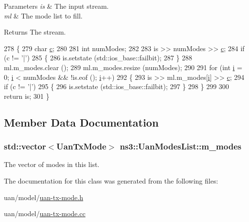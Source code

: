 \begin{DoxyParams}{Parameters}
{\em is} & The input stream. \\
\hline
{\em ml} & The mode list to fill. \\
\hline
\end{DoxyParams}
\begin{DoxyReturn}{Returns}
The stream. 
\end{DoxyReturn}

\begin{DoxyCode}
278 \{
279   \textcolor{keywordtype}{char} \hyperlink{lte_2model_2fading-traces_2fading__trace__generator_8m_ae0323a9039add2978bf5b49550572c7c}{c};
280 
281   \textcolor{keywordtype}{int} numModes;
282 
283   is >> numModes >> \hyperlink{lte_2model_2fading-traces_2fading__trace__generator_8m_ae0323a9039add2978bf5b49550572c7c}{c};
284   \textcolor{keywordflow}{if} (c != \textcolor{charliteral}{'|'})
285     \{
286       is.setstate (std::ios\_base::failbit);
287     \}
288   ml.m\_modes.clear ();
289   ml.m\_modes.resize (numModes);
290 
291   \textcolor{keywordflow}{for} (\textcolor{keywordtype}{int} \hyperlink{bernuolliDistribution_8m_a6f6ccfcf58b31cb6412107d9d5281426}{i} = 0; \hyperlink{bernuolliDistribution_8m_a6f6ccfcf58b31cb6412107d9d5281426}{i} < numModes && !is.eof (); \hyperlink{bernuolliDistribution_8m_a6f6ccfcf58b31cb6412107d9d5281426}{i}++)
292     \{
293       is >> ml.m\_modes[\hyperlink{bernuolliDistribution_8m_a6f6ccfcf58b31cb6412107d9d5281426}{i}] >> \hyperlink{lte_2model_2fading-traces_2fading__trace__generator_8m_ae0323a9039add2978bf5b49550572c7c}{c};
294       \textcolor{keywordflow}{if} (c != \textcolor{charliteral}{'|'})
295         \{
296           is.setstate (std::ios\_base::failbit);
297         \}
298     \}
299 
300   \textcolor{keywordflow}{return} is;
301 \}
\end{DoxyCode}


\subsection{Member Data Documentation}
\subsubsection[{\texorpdfstring{m\+\_\+modes}{m_modes}}]{\setlength{\rightskip}{0pt plus 5cm}std\+::vector$<${\bf Uan\+Tx\+Mode}$>$ ns3\+::\+Uan\+Modes\+List\+::m\+\_\+modes\hspace{0.3cm}{\ttfamily [private]}}\hypertarget{classns3_1_1UanModesList_afa651aaf3962736a50ddc70e961000cb}{}\label{classns3_1_1UanModesList_afa651aaf3962736a50ddc70e961000cb}
The vector of modes in this list. 

The documentation for this class was generated from the following files\+:\begin{DoxyCompactItemize}
\item 
uan/model/\hyperlink{uan-tx-mode_8h}{uan-\/tx-\/mode.\+h}\item 
uan/model/\hyperlink{uan-tx-mode_8cc}{uan-\/tx-\/mode.\+cc}\end{DoxyCompactItemize}
